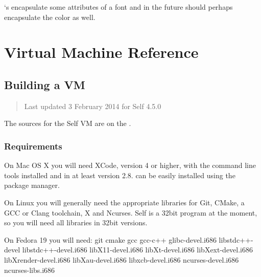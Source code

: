 \documentclass[letterpaper,10pt,english]{sphinxmanual}
\begin{document}
\begin{sphinxVerbatim}[commandchars=\\\{\}]
 
          
\end{sphinxVerbatim}

`s encapsulate some attributes of a font and in the future should perhaps encapsulate the color as well.


\chapter{Virtual Machine Reference}
\label{\detokenize{vmref:pp-vmref}}\label{\detokenize{vmref::doc}}\label{\detokenize{vmref:virtual-machine-reference}}

\section{Building a VM}
\label{\detokenize{buildvm:building-a-vm}}\label{\detokenize{buildvm::doc}}\label{\detokenize{buildvm:id1}}\begin{quote}

Last updated 3 February 2014 for Self 4.5.0
\end{quote}

The sources for the Self VM are on the .


\subsection{Requirements}
\label{\detokenize{buildvm:requirements}}
On Mac OS X you will need XCode, version 4 or higher, with the command line tools installed and  in at least version 2.8.  can be easily installed using the  package manager.

On Linux you will generally need the appropriate libraries for Git, CMake, a GCC or Clang toolchain, X and Ncurses. Self is a 32bit program at the moment, so you will need all libraries in 32bit versions.

On Fedora 19 you will need: git cmake gcc gcc-c++ glibc-devel.i686 libstdc++-devel libstdc++-devel.i686 libX11-devel.i686 libXt-devel.i686 libXext-devel.i686 libXrender-devel.i686 libXau-devel.i686 libxcb-devel.i686 ncurses-devel.i686 ncurses-libs.i686
\end{document}
